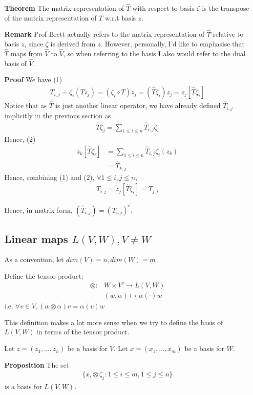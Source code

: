 \documentclass{article}
\begin{document}
\textbf{Theorem} The matrix representation of $\hat{T}$ with respect to basis $\zeta$ is the transpose of the matrix representation of $T$ w.r.t basis $z$.

\textbf{Remark} Prof Brett actually refers to the matrix representation of $\hat{T}$ relative to basis $z$, since $\zeta$ is derived from $z$. However, personally, I'd like to emphasise that $\hat{T}$ maps from $\hat{V}$ to $\hat{V}$, so when referring to the basis I also would refer to the dual basis of $\hat{V}$.

\textbf{Proof}
We have
(1)
\begin{align*}
	T_{i,j}=\zeta_i(Tz_j)=(\zeta_i\circ T)z_j=(\hat{T}\zeta_i)z_j=z_j[\hat{T}\zeta_i]
\end{align*}
Notice that as $\hat{T}$ is just another linear operator, we have already defined $\hat{T}_{i,j}$ implicitly in the previous section as 
\begin{align*}
	\hat{T}\zeta_j=\sum_{1\leq i\leq n}\hat{T}_{i,j}\zeta_i
\end{align*}
Hence, 
(2)
\begin{align*}
	z_k[\hat{T}\zeta_i]&=\sum_{1\leq i\leq n}\hat{T}_{i,j}\zeta_i(z_k)\\
	&=\hat{T}_{k,j}
\end{align*}
Hence, combining (1) and (2), $\forall 1\leq i,j\leq n$,
\begin{align*}
	T_{i,j}=z_j[\hat{T}\zeta_i]=\hat{T}_{j,i}
\end{align*}

Hence, in matrix form, $(\hat{T}_{i,j})=(T_{i,j})^t$.


\subsection{Linear maps $L(V,W), V\neq W$}
As a convention, let $dim(V)=n, dim(W)=m$

Define the tensor product:
\begin{align*}
	\otimes: &W \times V' \rightarrow L(V,W)\\
	&(w, \alpha) \mapsto \alpha(\cdot)w
\end{align*}
i.e. $\forall v\in V, (w \otimes \alpha)v = \alpha(v)w$

This definition makes a lot more sense when we try to define the basis of $L(V,W)$ in terms of the tensor product.

Let $z=(z_1,\dots, z_n)$ be a basis for $V$.
Let $x=(x_1,\dots, x_m)$ be a basis for $W$.

\textbf{Proposition} The set 
\begin{align*}
	\{x_i \otimes \zeta_j : 1\leq i\leq m, 1\leq j\leq n\}
\end{align*}
is a basis for $L(V,W)$.
\end{document}
